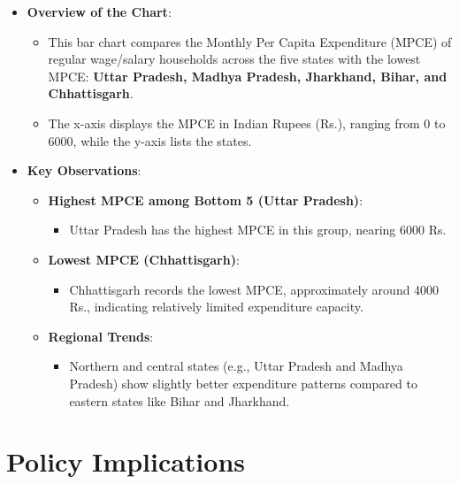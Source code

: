 \documentclass{article}
\begin{document}
\begin{itemize}
	\item \textbf{Overview of the Chart}:
	\begin{itemize}
		\item This bar chart compares the Monthly Per Capita Expenditure (MPCE) of regular wage/salary households across the five states with the lowest MPCE: \textbf{Uttar Pradesh, Madhya Pradesh, Jharkhand, Bihar, and Chhattisgarh}.
		\item The x-axis displays the MPCE in Indian Rupees (Rs.), ranging from 0 to 6000, while the y-axis lists the states.
	\end{itemize}
	\item \textbf{Key Observations}:
	\begin{itemize}
		\item \textbf{Highest MPCE among Bottom 5 (Uttar Pradesh)}:
		\begin{itemize}
			\item Uttar Pradesh has the highest MPCE in this group, nearing 6000 Rs.
		\end{itemize}
		\item \textbf{Lowest MPCE (Chhattisgarh)}:
		\begin{itemize}
			\item Chhattisgarh records the lowest MPCE, approximately around 4000 Rs., indicating relatively limited expenditure capacity.
		\end{itemize}
		\item \textbf{Regional Trends}:
		\begin{itemize}
			\item Northern and central states (e.g., Uttar Pradesh and Madhya Pradesh) show slightly better expenditure patterns compared to eastern states like Bihar and Jharkhand.
		\end{itemize}
	\end{itemize}
\end{itemize}

\section*{Policy Implications}
\end{document}

